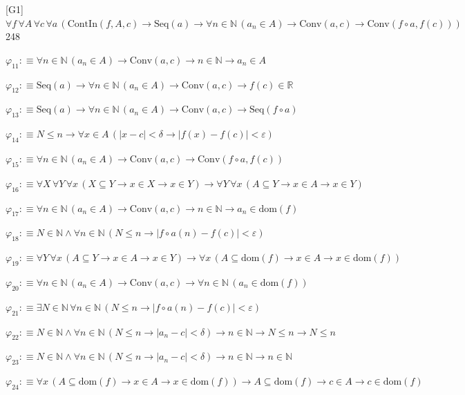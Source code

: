 \begin{fullproof}{[G1]}{$\forall f\,\forall A\,\forall c\,\forall a\,(\mathrm{ContIn}(f,A,c) \to \mathrm{Seq}(a) \to \forall n \in \mathbb{N}\,(a_{n} \in A) \to \mathrm{Conv}(a,c) \to \mathrm{Conv}(f \circ a,f(c)))$}{248}
\begin{abbrevlist}
\item $\varphi_{11} :\equiv \forall n \in \mathbb{N}\,(a_{n} \in A) \to \mathrm{Conv}(a,c) \to n \in \mathbb{N} \to a_{n} \in A$
\item $\varphi_{12} :\equiv \mathrm{Seq}(a) \to \forall n \in \mathbb{N}\,(a_{n} \in A) \to \mathrm{Conv}(a,c) \to f(c) \in \mathbb{R}$
\item $\varphi_{13} :\equiv \mathrm{Seq}(a) \to \forall n \in \mathbb{N}\,(a_{n} \in A) \to \mathrm{Conv}(a,c) \to \mathrm{Seq}(f \circ a)$
\item $\varphi_{14} :\equiv N \leq n \to \forall x \in A\,(\lvert x - c \rvert < \delta \to \lvert f(x) - f(c) \rvert < \varepsilon)$
\item $\varphi_{15} :\equiv \forall n \in \mathbb{N}\,(a_{n} \in A) \to \mathrm{Conv}(a,c) \to \mathrm{Conv}(f \circ a,f(c))$
\item $\varphi_{16} :\equiv \forall X\,\forall Y\,\forall x\,(X \subseteq Y \to x \in X \to x \in Y) \to \forall Y\,\forall x\,(A \subseteq Y \to x \in A \to x \in Y)$
\item $\varphi_{17} :\equiv \forall n \in \mathbb{N}\,(a_{n} \in A) \to \mathrm{Conv}(a,c) \to n \in \mathbb{N} \to a_{n} \in \mathrm{dom}(f)$
\item $\varphi_{18} :\equiv N \in \mathbb{N} \land \forall n \in \mathbb{N}\,(N \leq n \to \lvert f \circ a(n) - f(c) \rvert < \varepsilon)$
\item $\varphi_{19} :\equiv \forall Y\,\forall x\,(A \subseteq Y \to x \in A \to x \in Y) \to \forall x\,(A \subseteq \mathrm{dom}(f) \to x \in A \to x \in \mathrm{dom}(f))$
\item $\varphi_{20} :\equiv \forall n \in \mathbb{N}\,(a_{n} \in A) \to \mathrm{Conv}(a,c) \to \forall n \in \mathbb{N}\,(a_{n} \in \mathrm{dom}(f))$
\item $\varphi_{21} :\equiv \exists N \in \mathbb{N}\,\forall n \in \mathbb{N}\,(N \leq n \to \lvert f \circ a(n) - f(c) \rvert < \varepsilon)$
\item $\varphi_{22} :\equiv N \in \mathbb{N} \land \forall n \in \mathbb{N}\,(N \leq n \to \lvert a_{n} - c \rvert < \delta) \to n \in \mathbb{N} \to N \leq n \to N \leq n$
\item $\varphi_{23} :\equiv N \in \mathbb{N} \land \forall n \in \mathbb{N}\,(N \leq n \to \lvert a_{n} - c \rvert < \delta) \to n \in \mathbb{N} \to n \in \mathbb{N}$
\item $\varphi_{24} :\equiv \forall x\,(A \subseteq \mathrm{dom}(f) \to x \in A \to x \in \mathrm{dom}(f)) \to A \subseteq \mathrm{dom}(f) \to c \in A \to c \in \mathrm{dom}(f)$

\end{abbrevlist}
\end{fullproof}

